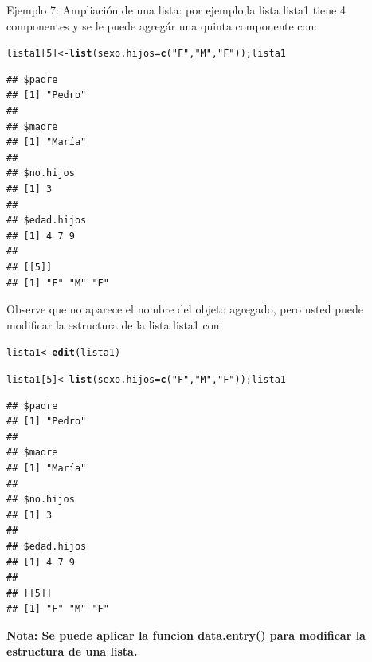 \documentclass[12pt,letterpaper]{article}\usepackage[]{graphicx}\usepackage[]{color}
\makeatletter
\newcommand{\hlnum}[1]{\textcolor[rgb]{0.686,0.059,0.569}{#1}}%
\newcommand{\hlstr}[1]{\textcolor[rgb]{0.192,0.494,0.8}{#1}}%
\newcommand{\hlstd}[1]{\textcolor[rgb]{0.345,0.345,0.345}{#1}}%
\newcommand{\hlkwb}[1]{\textcolor[rgb]{0.69,0.353,0.396}{#1}}%
\newcommand{\hlkwc}[1]{\textcolor[rgb]{0.333,0.667,0.333}{#1}}%
\newcommand{\hlkwd}[1]{\textcolor[rgb]{0.737,0.353,0.396}{\textbf{#1}}}%
\newenvironment{kframe}{%
 \def\at@end@of@kframe{}%
 \ifinner\ifhmode%
  \def\at@end@of@kframe{\end{minipage}}%
  \begin{minipage}{\columnwidth}%
 \fi\fi%
 \def\FrameCommand##1{\hskip\@totalleftmargin \hskip-\fboxsep
 \colorbox{shadecolor}{##1}\hskip-\fboxsep
     \hskip-\linewidth \hskip-\@totalleftmargin \hskip\columnwidth}%
 \MakeFramed {\advance\hsize-\width
   \@totalleftmargin\z@ \linewidth\hsize
   \@setminipage}}%
 {\par\unskip\endMakeFramed%
 \at@end@of@kframe}
\newenvironment{knitrout}{}{} %
\makeatother
\begin{document}
Ejemplo 7: Ampliaci\'on de una lista: por ejemplo,la lista lista1 tiene 4\\
componentes y se le puede agreg\'ar una quinta componente con:\\
\begin{knitrout}
\color{fgcolor}\begin{kframe}
\begin{alltt}
\hlstd{lista1[}\hlnum{5}\hlstd{]} \hlkwb{<-} \hlkwd{list}\hlstd{(}\hlkwc{sexo.hijos}\hlstd{=}\hlkwd{c}\hlstd{(}\hlstr{"F"}\hlstd{,} \hlstr{"M"}\hlstd{,} \hlstr{"F"}\hlstd{)); lista1}
\end{alltt}
\begin{verbatim}
## $padre
## [1] "Pedro"
## 
## $madre
## [1] "María"
## 
## $no.hijos
## [1] 3
## 
## $edad.hijos
## [1] 4 7 9
## 
## [[5]]
## [1] "F" "M" "F"
\end{verbatim}
\end{kframe}
\end{knitrout}

Observe que no aparece el nombre del objeto agregado, pero usted puede modificar la estructura de la lista lista1 con:
\begin{knitrout}
\color{fgcolor}\begin{kframe}
\begin{alltt}
\hlstd{lista1} \hlkwb{<-} \hlkwd{edit}\hlstd{(lista1)}
\end{alltt}
\end{kframe}
\end{knitrout}
\begin{knitrout}
\color{fgcolor}\begin{kframe}
\begin{alltt}
\hlstd{lista1[}\hlnum{5}\hlstd{]} \hlkwb{<-} \hlkwd{list}\hlstd{(}\hlkwc{sexo.hijos}\hlstd{=}\hlkwd{c}\hlstd{(}\hlstr{"F"}\hlstd{,} \hlstr{"M"}\hlstd{,} \hlstr{"F"}\hlstd{)); lista1}
\end{alltt}
\begin{verbatim}
## $padre
## [1] "Pedro"
## 
## $madre
## [1] "María"
## 
## $no.hijos
## [1] 3
## 
## $edad.hijos
## [1] 4 7 9
## 
## [[5]]
## [1] "F" "M" "F"
\end{verbatim}
\end{kframe}
\end{knitrout}

\textbf{Nota: Se puede aplicar la funcion data.entry() para modificar la estructura de una lista.}\\
\end{document}
